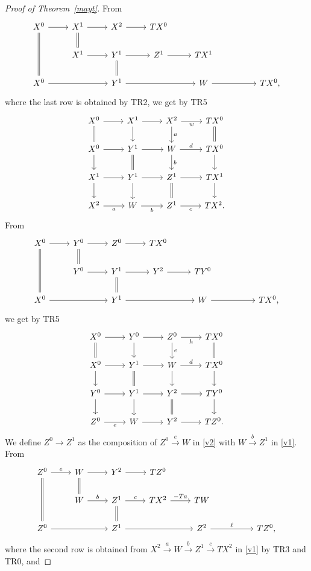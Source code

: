 \documentclass[12pt]{article}%
\theoremstyle{remark}
\theoremstyle{definition}
\newcommand{\xr}{\xrightarrow}
\begin{document}
\begin{proof}[Proof of Theorem~\ref{mayt}]
From 
$$
\begin{tikzcd}
X^0\ar[equal]{dd}\ar{r}&X^1\ar[equal]{d}\ar{r}&X^2\ar{r}&TX^0\\
&X^1\ar{r}&Y^1\ar[equal]{d}\ar{r}&Z^1\ar{r}&TX^1\\
X^0\ar{rr}&&Y^1\ar{rr}&&W\ar{rr}&&TX^0,
\end{tikzcd}
$$
where the last row is obtained by TR2, we get by TR5
\begin{equation}\label{v1}
\begin{tikzcd}
X^0\ar{r}\ar[equal]{d}&X^1\ar{d}\ar{r}&X^2\ar{d}{a}\ar{r}[swap]{w}&TX^0\ar[equal]{d}\\
X^0\ar{d}\ar{r}&Y^1\ar{r}\ar[equal]{d}&W\ar{d}{b}\ar{r}{d}&TX^0\ar{d}\\
X^1\ar{d}\ar{r}&Y^1\ar{d}\ar{r}&Z^1\ar{r}\ar[equal]{d}&TX^1\ar{d}\\
X^2\ar{r}[swap]{a}&W\ar{r}[swap]{b}&Z^1\ar{r}[swap]{c}&TX^2.
\end{tikzcd}
\end{equation}
%
From 
$$
\begin{tikzcd}
X^0\ar[equal]{dd}\ar{r}&Y^0\ar[equal]{d}\ar{r}&Z^0\ar{r}&TX^0\\
&Y^0\ar{r}&Y^1\ar[equal]{d}\ar{r}&Y^2\ar{r}&TY^0\\
X^0\ar{rr}&&Y^1\ar{rr}&&W\ar{rr}&&TX^0,
\end{tikzcd}
$$
we get by TR5
\begin{equation}\label{v2}
\begin{tikzcd}
X^0\ar{r}\ar[equal]{d}&Y^0\ar{d}\ar{r}&Z^0\ar{d}{e}\ar{r}[swap]{h}&TX^0\ar[equal]{d}\\
X^0\ar{d}\ar{r}&Y^1\ar{r}\ar[equal]{d}&W\ar{d}\ar{r}{d}&TX^0\ar{d}\\
Y^0\ar{d}\ar{r}&Y^1\ar{d}\ar{r}&Y^2\ar{r}\ar[equal]{d}&TY^0\ar{d}\\
Z^0\ar{r}[swap]{e}&W\ar{r}&Y^2\ar{r}&TZ^0.
\end{tikzcd}
\end{equation}
%
We define $Z^0\to Z^1$ as the composition of $Z^0\xr eW$ in \eqref{v2} with $W\xr bZ^1$ in \eqref{v1}. From 
$$
\begin{tikzcd}
Z^0\ar[equal]{dd}\ar{r}{e}&W\ar[equal]{d}\ar{r}&Y^2\ar{r}&TZ^0\\
&W\ar{r}{b}&Z^1\ar[equal]{d}\ar{r}{c}&TX^2\ar{r}{-Ta}&TW\\
Z^0\ar{rr}&&Z^1\ar{rr}&&Z^2\ar{rr}{\ell}&&TZ^0,
\end{tikzcd}
$$
where the second row is obtained from $X^2\xr aW\xr bZ^1\xr cTX^2$ in \eqref{v1} by TR3 and TR0, and 

\end{proof}
\end{document}
